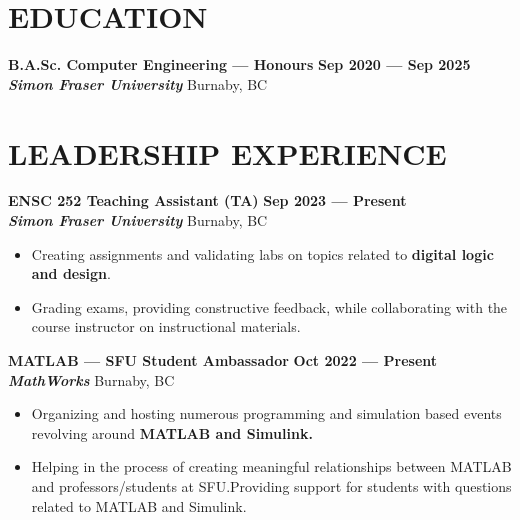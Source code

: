 \documentclass[letterpaper,11pt]{article}
\newcommand{\Item} [1] {
    \item\small{{#1 \vspace{-2pt}}}
}
\newcommand{\employer} [5] {
    {\textbf{#3} \hfill \textbf{#4 --- #5}\\ \textbf{\emph{#1}} \hfill #2\\}
}
\newcommand{\school} [5] {
    {\textbf{#3} \hfill \textbf{#4 --- #5}\\ \textbf{\emph{#1}} \hfill #2\\}
}
\newcommand{\workItemListStart} [0] {
    \vspace{-1pt}
    \begin{itemize}[topsep=0pt,itemsep=-2pt]
}
\newcommand{\workItemListEnd} [0] {
    \end{itemize}
    \vspace{1pt}
}
\begin{document}
    \section{EDUCATION}
    \school{Simon Fraser University}{Burnaby, BC}{B.A.Sc. Computer Engineering --- Honours}{Sep 2020}{Sep 2025}

    \section{LEADERSHIP EXPERIENCE}
    \employer{Simon Fraser University}{Burnaby, BC}{ENSC 252 Teaching Assistant (TA)}{Sep 2023}{Present}
    \workItemListStart{}
    \Item{Creating assignments and validating labs on topics related to \textbf{digital logic and design}.}
    \Item{Grading exams, providing constructive feedback, while collaborating with the course instructor on instructional materials.}
    \workItemListEnd{}
    \employer{MathWorks}{Burnaby, BC}{MATLAB --- SFU Student Ambassador}{Oct 2022}{Present}
    \workItemListStart{}
        \Item{Organizing and hosting numerous programming and simulation based events revolving around \textbf{MATLAB and Simulink.}}
        \Item{Helping in the process of creating meaningful relationships between MATLAB and professors/students at SFU.\@ Providing support for students with questions related to MATLAB and Simulink.}
    \workItemListEnd{}
\end{document}
